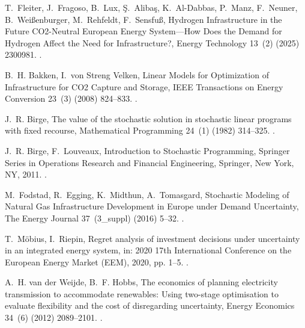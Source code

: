 \documentclass[preprint,12pt,sort&compress]{elsarticle}
\begin{document}
\begin{thebibliography}{10}
T.~Fleiter, J.~Fragoso, B.~Lux, {\c S}.~Aliba{\c s}, K.~{Al-Dabbas}, P.~Manz, F.~Neuner, B.~Wei{\ss}enburger, M.~Rehfeldt, F.~Sensfu{\ss}, Hydrogen {{Infrastructure}} in the {{Future CO2-Neutral European Energy System}}---{{How Does}} the {{Demand}} for {{Hydrogen Affect}} the {{Need}} for {{Infrastructure}}?, Energy Technology 13~(2) (2025) 2300981.
\newblock \href {https://doi.org/10.1002/ente.202300981} {}.

B.~H. Bakken, I.~{von Streng Velken}, Linear {{Models}} for {{Optimization}} of {{Infrastructure}} for {{CO2 Capture}} and {{Storage}}, IEEE Transactions on Energy Conversion 23~(3) (2008) 824--833.
\newblock \href {https://doi.org/10.1109/TEC.2008.921474} {}.

J.~R. Birge, The value of the stochastic solution in stochastic linear programs with fixed recourse, Mathematical Programming 24~(1) (1982) 314--325.
\newblock \href {https://doi.org/10.1007/BF01585113} {}.

J.~R. Birge, F.~Louveaux, Introduction to {{Stochastic Programming}}, Springer {{Series}} in {{Operations Research}} and {{Financial Engineering}}, Springer, New York, NY, 2011.
\newblock \href {https://doi.org/10.1007/978-1-4614-0237-4} {}.

M.~Fodstad, R.~Egging, K.~Midthun, A.~Tomasgard, Stochastic {{Modeling}} of {{Natural Gas Infrastructure Development}} in {{Europe}} under {{Demand Uncertainty}}, The Energy Journal 37~(3\_suppl) (2016) 5--32.
\newblock \href {https://doi.org/10.5547/01956574.37.SI3.mfod} {}.

T.~M{\"o}bius, I.~Riepin, Regret analysis of investment decisions under uncertainty in an integrated energy system, in: 2020 17th {{International Conference}} on the {{European Energy Market}} ({{EEM}}), 2020, pp. 1--5.
\newblock \href {https://doi.org/10.1109/EEM49802.2020.9221935} {}.

A.~H. {van der Weijde}, B.~F. Hobbs, The economics of planning electricity transmission to accommodate renewables: {{Using}} two-stage optimisation to evaluate flexibility and the cost of disregarding uncertainty, Energy Economics 34~(6) (2012) 2089--2101.
\newblock \href {https://doi.org/10.1016/j.eneco.2012.02.015} {}.


\end{thebibliography}
\end{document}
